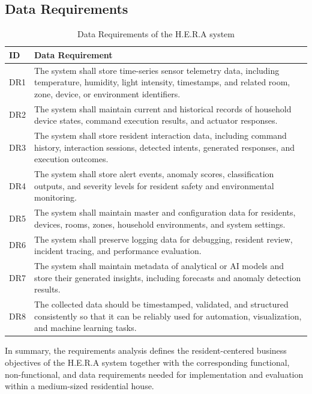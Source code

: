 \FloatBarrier

\subsection{Data Requirements}

\begin{table}[H]
	\centering
	\caption{Data Requirements of the H.E.R.A system}
	\label{tab:data_requirements}
	\renewcommand{\arraystretch}{1.2}
	\small
	\begin{tabularx}{\textwidth}{|>{\centering\arraybackslash}p{1.2cm}|X|}
		\hline
		\textbf{ID} & \textbf{Data Requirement} \\
		\hline \hline
		DR1 & The system shall store time-series sensor telemetry data, including temperature, humidity, light intensity, timestamps, and related room, zone, device, or environment identifiers. \\
		\hline
		DR2 & The system shall maintain current and historical records of household device states, command execution results, and actuator responses. \\
		\hline
		DR3 & The system shall store resident interaction data, including command history, interaction sessions, detected intents, generated responses, and execution outcomes. \\
		\hline
		DR4 & The system shall store alert events, anomaly scores, classification outputs, and severity levels for resident safety and environmental monitoring. \\
		\hline
		DR5 & The system shall maintain master and configuration data for residents, devices, rooms, zones, household environments, and system settings. \\
		\hline
		DR6 & The system shall preserve logging data for debugging, resident review, incident tracing, and performance evaluation. \\
		\hline
		DR7 & The system shall maintain metadata of analytical or AI models and store their generated insights, including forecasts and anomaly detection results. \\
		\hline
		DR8 & The collected data should be timestamped, validated, and structured consistently so that it can be reliably used for automation, visualization, and machine learning tasks. \\
		\hline
	\end{tabularx}
\end{table}

\FloatBarrier

In summary, the requirements analysis defines the resident-centered business objectives of the H.E.R.A system together with the corresponding functional, non-functional, and data requirements needed for implementation and evaluation within a medium-sized residential house.
